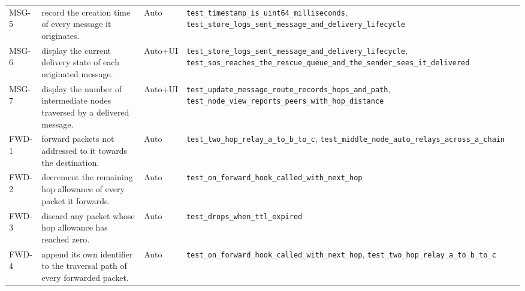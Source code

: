 \begin{longtable}{@{}p{0.95cm}p{6.6cm}p{1.15cm}p{8.6cm}@{}}
MSG-5 & record the creation time of every message it originates. & Auto & \texttt{test\_\allowbreak{}timestamp\_\allowbreak{}is\_\allowbreak{}uint64\_\allowbreak{}milliseconds}, \texttt{test\_\allowbreak{}store\_\allowbreak{}logs\_\allowbreak{}sent\_\allowbreak{}message\_\allowbreak{}and\_\allowbreak{}delivery\_\allowbreak{}lifecycle} \\
MSG-6 & display the current delivery state of each originated message. & Auto+UI & \texttt{test\_\allowbreak{}store\_\allowbreak{}logs\_\allowbreak{}sent\_\allowbreak{}message\_\allowbreak{}and\_\allowbreak{}delivery\_\allowbreak{}lifecycle}, \texttt{test\_\allowbreak{}sos\_\allowbreak{}reaches\_\allowbreak{}the\_\allowbreak{}rescue\_\allowbreak{}queue\_\allowbreak{}and\_\allowbreak{}the\_\allowbreak{}sender\_\allowbreak{}sees\_\allowbreak{}it\_\allowbreak{}delivered} \\
MSG-7 & display the number of intermediate nodes traversed by a delivered message. & Auto+UI & \texttt{test\_\allowbreak{}update\_\allowbreak{}message\_\allowbreak{}route\_\allowbreak{}records\_\allowbreak{}hops\_\allowbreak{}and\_\allowbreak{}path}, \texttt{test\_\allowbreak{}node\_\allowbreak{}view\_\allowbreak{}reports\_\allowbreak{}peers\_\allowbreak{}with\_\allowbreak{}hop\_\allowbreak{}distance} \\
FWD-1 & forward packets not addressed to it towards the destination. & Auto & \texttt{test\_\allowbreak{}two\_\allowbreak{}hop\_\allowbreak{}relay\_\allowbreak{}a\_\allowbreak{}to\_\allowbreak{}b\_\allowbreak{}to\_\allowbreak{}c}, \texttt{test\_\allowbreak{}middle\_\allowbreak{}node\_\allowbreak{}auto\_\allowbreak{}relays\_\allowbreak{}across\_\allowbreak{}a\_\allowbreak{}chain} \\
FWD-2 & decrement the remaining hop allowance of every packet it forwards. & Auto & \texttt{test\_\allowbreak{}on\_\allowbreak{}forward\_\allowbreak{}hook\_\allowbreak{}called\_\allowbreak{}with\_\allowbreak{}next\_\allowbreak{}hop} \\
FWD-3 & discard any packet whose hop allowance has reached zero. & Auto & \texttt{test\_\allowbreak{}drops\_\allowbreak{}when\_\allowbreak{}ttl\_\allowbreak{}expired} \\
FWD-4 & append its own identifier to the traversal path of every forwarded packet. & Auto & \texttt{test\_\allowbreak{}on\_\allowbreak{}forward\_\allowbreak{}hook\_\allowbreak{}called\_\allowbreak{}with\_\allowbreak{}next\_\allowbreak{}hop}, \texttt{test\_\allowbreak{}two\_\allowbreak{}hop\_\allowbreak{}relay\_\allowbreak{}a\_\allowbreak{}to\_\allowbreak{}b\_\allowbreak{}to\_\allowbreak{}c} \\

\end{longtable}
